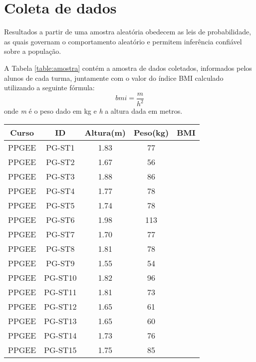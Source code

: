 \documentclass[12pt, a4paper]{article}
\begin{document}
\section{Coleta de dados}
Resultados a partir de uma amostra aleatória obedecem as leis de probabilidade, as quais governam o comportamento aleatório e permitem inferência confiável sobre a população.
\par A Tabela \ref{table:amostra} contém a amostra de dados coletados, informados pelos alunos de cada turma, juntamente com o valor do índice BMI calculado utilizando a seguinte fórmula:
\begin{equation}
bmi = \frac{m}{h^{2}}
\end{equation}
\newline onde \textit{m} é o peso dado em kg e \textit{h} a altura dada em metros.
\pagebreak
\begin{longtable}{|c|c|c|c|c|}
\hline
\rule[-1.0ex]{0pt}{4.0ex}
\textbf{Curso}&\textbf{ID}&\textbf{Altura(m)}&\textbf{Peso(kg)}&\textbf{BMI}\\ \hline
\endhead
\rule[-1.0ex]{0pt}{4.0ex}
PPGEE&PG-ST1&1.83&77& \\ \hline
\rule[-1.0ex]{0pt}{4.0ex}
PPGEE&PG-ST2&1.67&56& \\ \hline
\rule[-1.0ex]{0pt}{4.0ex}
PPGEE&PG-ST3&1.88&86& \\ \hline
\rule[-1.0ex]{0pt}{4.0ex}
PPGEE&PG-ST4&1.77&78& \\ \hline
\rule[-1.0ex]{0pt}{4.0ex}
PPGEE&PG-ST5&1.74&78& \\ \hline
\rule[-1.0ex]{0pt}{4.0ex}
PPGEE&PG-ST6&1.98&113& \\ \hline
\rule[-1.0ex]{0pt}{4.0ex}
PPGEE&PG-ST7&1.70&77& \\ \hline
\rule[-1.0ex]{0pt}{4.0ex}
PPGEE&PG-ST8&1.81&78& \\ \hline
\rule[-1.0ex]{0pt}{4.0ex}
PPGEE&PG-ST9&1.55&54& \\ \hline
\rule[-1.0ex]{0pt}{4.0ex}
PPGEE&PG-ST10&1.82&96& \\ \hline
\rule[-1.0ex]{0pt}{4.0ex}
PPGEE&PG-ST11&1.81&73& \\ \hline
\rule[-1.0ex]{0pt}{4.0ex}
PPGEE&PG-ST12&1.65&61& \\ \hline
\rule[-1.0ex]{0pt}{4.0ex}
PPGEE&PG-ST13&1.65&60& \\ \hline
\rule[-1.0ex]{0pt}{4.0ex}
PPGEE&PG-ST14&1.73&76& \\ \hline
\rule[-1.0ex]{0pt}{4.0ex}
PPGEE&PG-ST15&1.75&85& \\ \hline

\end{longtable}
\end{document}
